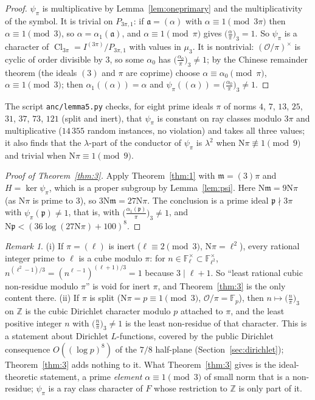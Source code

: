 \documentclass[11pt]{article}
\theoremstyle{definition}
\theoremstyle{remark}
\newtheorem{remark}[lemma]{Remark}
\numberwithin{equation}{section}
\newcommand{\Z}{\mathbb Z}
\newcommand{\cO}{\mathcal O}
\newcommand{\fa}{\mathfrak a}
\newcommand{\fp}{\mathfrak p}
\newcommand{\fm}{\mathfrak m}
\newcommand{\Nm}{\mathrm N}
\newcommand{\Cl}{\operatorname{Cl}}
\newcommand{\cubic}[2]{\bigl(\tfrac{#1}{#2}\bigr)_{3}}
\begin{document}
\begin{proof}
$\psi_\pi$ is multiplicative by Lemma~\ref{lem:oneprimary} and the multiplicativity of the symbol. It is trivial on $P_{3\pi,1}$: if $\fa=(\alpha)$ with $\alpha\equiv1\pmod{3\pi}$ then $\alpha\equiv1\pmod3$, so $\alpha=\alpha_1(\fa)$, and $\alpha\equiv1\pmod\pi$ gives $\cubic{\alpha}{\pi}=1$. So $\psi_\pi$ is a character of $\Cl_{3\pi}=I^{(3\pi)}/P_{3\pi,1}$ with values in $\mu_3$. It is nontrivial: $(\cO/\pi)^\times$ is cyclic of order divisible by $3$, so some $\alpha_0$ has $\cubic{\alpha_0}{\pi}\ne1$; by the Chinese remainder theorem (the ideals $(3)$ and $\pi$ are coprime) choose $\alpha\equiv\alpha_0\pmod\pi$, $\alpha\equiv1\pmod3$; then $\alpha_1((\alpha))=\alpha$ and $\psi_\pi((\alpha))=\cubic{\alpha_0}{\pi}\ne1$.
\end{proof}

The script \texttt{anc/lemma5.py} checks, for eight prime ideals $\pi$ of norms $4$, $7$, $13$, $25$, $31$, $37$, $73$, $121$ (split and inert), that $\psi_\pi$ is constant on ray classes modulo $3\pi$ and multiplicative ($14\,355$ random instances, no violation) and takes all three values; it also finds that the $\lambda$-part of the conductor of $\psi_\pi$ is $\lambda^2$ when $\Nm\pi\not\equiv1\pmod9$ and trivial when $\Nm\pi\equiv1\pmod9$.

\begin{proof}[Proof of Theorem~\ref{thm:3}]
Apply Theorem~\ref{thm:1} with $\fm=(3)\pi$ and $H=\ker\psi_\pi$, which is a proper subgroup by Lemma~\ref{lem:psi}. Here $\Nm\fm=9\Nm\pi$ (as $\Nm\pi$ is prime to $3$), so $3\Nm\fm=27\Nm\pi$. The conclusion is a prime ideal $\fp\nmid3\pi$ with $\psi_\pi(\fp)\ne1$, that is, with $\cubic{\alpha_1(\fp)}{\pi}\ne1$, and $\Nm\fp<(36\log(27\Nm\pi)+100)^8$.
\end{proof}

\begin{remark}\label{rem:rational}
(i) If $\pi=(\ell)$ is inert ($\ell\equiv2\pmod3$, $\Nm\pi=\ell^2$), every rational integer prime to $\ell$ is a cube modulo $\pi$: for $n\in\mathbb F_\ell^\times\subset\mathbb F_{\ell^2}^\times$, $n^{(\ell^2-1)/3}=(n^{\ell-1})^{(\ell+1)/3}=1$ because $3\mid\ell+1$. So ``least rational cubic non-residue modulo $\pi$'' is void for inert $\pi$, and Theorem~\ref{thm:3} is the only content there.
(ii) If $\pi$ is split ($\Nm\pi=p\equiv1\pmod3$, $\cO/\pi=\mathbb F_p$), then $n\mapsto\cubic{n}{\pi}$ on $\Z$ is the cubic Dirichlet character modulo $p$ attached to $\pi$, and the least positive integer $n$ with $\cubic{n}{\pi}\ne1$ is the least non-residue of that character. This is a statement about Dirichlet $L$-functions, covered by the public Dirichlet consequence $O((\log p)^8)$ of the $7/8$ half-plane (Section~\ref{sec:dirichlet}); Theorem~\ref{thm:3} adds nothing to it. What Theorem~\ref{thm:3} gives is the ideal-theoretic statement, a prime \emph{element} $\alpha\equiv1\pmod3$ of small norm that is a non-residue; $\psi_\pi$ is a ray class character of $F$ whose restriction to $\Z$ is only part of it.
\end{remark}
\end{document}
